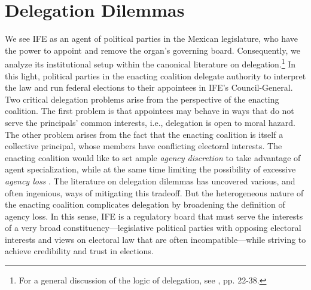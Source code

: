 \documentclass[12 pt, letter]{article}
\begin{document}
\section{Delegation Dilemmas}\label{S:delegation} We see IFE as an agent of political parties in the Mexican legislature, who have the power to appoint and remove the organ's governing board. Consequently, we analyze its institutional setup within the canonical literature on delegation.\footnote{For a general discussion of the logic of delegation, see \citet{Kiewiet1991}, pp. 22-38.}  In this light, political parties in the enacting coalition delegate authority to interpret the law and run federal elections to their appointees in IFE's Council-General.  Two critical delegation problems arise from the perspective of the enacting coalition.   The first problem is that appointees may behave in ways that do not serve the principals' common interests, i.e., delegation is open to moral hazard. The other problem arises from the fact that the enacting coalition is itself a collective principal, whose members have conflicting electoral interests. The enacting coalition would like to set ample \emph{agency discretion} to take advantage of agent specialization, while at the same time limiting the possibility of excessive \emph{agency loss} \citep{Madison1788, McCubbins1987, Huber2002, Miller2005}.  The literature on delegation dilemmas has uncovered various, and often ingenious, ways of mitigating this tradeoff.  But the heterogeneous nature of the enacting coalition complicates delegation by broadening the definition of agency loss.  In this sense, IFE is a regulatory board that must serve the interests of a very broad constituency---legislative political parties with opposing electoral interests and views on electoral law that are often incompatible---while striving to achieve credibility and trust in elections.
\end{document}
